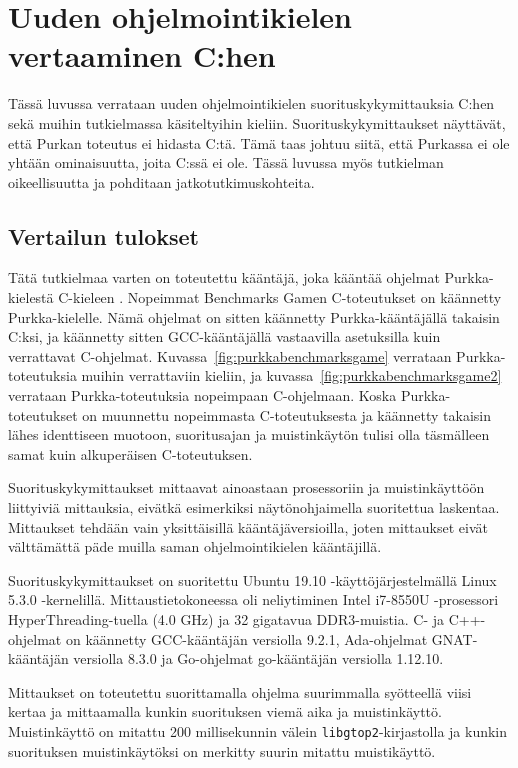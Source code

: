 \section{Uuden ohjelmointikielen vertaaminen C:hen}

Tässä luvussa verrataan uuden ohjelmointikielen suorituskykymittauksia C:hen
sekä muihin tutkielmassa käsiteltyihin kieliin. Suorituskykymittaukset
näyttävät, että Purkan toteutus ei hidasta C:tä. Tämä taas johtuu siitä, että
Purkassa ei ole yhtään ominaisuutta, joita C:ssä ei ole. Tässä luvussa myös
tutkielman oikeellisuutta ja pohditaan jatkotutkimuskohteita.

\subsection{Vertailun tulokset}
\label{sec:results}

Tätä tutkielmaa varten on toteutettu kääntäjä, joka kääntää ohjelmat
Purkka-kielestä C-kieleen \citep{purkka}. Nopeimmat Benchmarks Gamen
C-toteutukset on käännetty Purkka-kielelle. Nämä ohjelmat on sitten käännetty
Purkka-kääntäjällä takaisin C:ksi, ja käännetty sitten GCC-kääntäjällä
vastaavilla asetuksilla kuin verrattavat C-ohjelmat.
Kuvassa~\ref{fig:purkkabenchmarksgame} verrataan Purkka-toteutuksia muihin
verrattaviin kieliin, ja kuvassa~\ref{fig:purkkabenchmarksgame2} verrataan
Purkka-toteutuksia nopeimpaan C-ohjelmaan. Koska Purkka-toteutukset on
muunnettu nopeimmasta C-toteutuksesta ja käännetty takaisin lähes identtiseen
muotoon, suoritusajan ja muistinkäytön tulisi olla täsmälleen samat kuin
alkuperäisen C-toteutuksen.

Suorituskykymittaukset mittaavat ainoastaan prosessoriin ja muistinkäyttöön
liittyiviä mittauksia, eivätkä esimerkiksi näytönohjaimella suoritettua
laskentaa. Mittaukset tehdään vain yksittäisillä kääntäjäversioilla, joten
mittaukset eivät välttämättä päde muilla saman ohjelmointikielen kääntäjillä.

Suorituskykymittaukset on suoritettu Ubuntu 19.10 -käyttöjärjestelmällä Linux
5.3.0 -kernelillä. Mittaustietokoneessa oli neliytiminen Intel i7-8550U
-prosessori Hy\-per\-Thread\-ing-tuella (4.0 GHz) ja 32 gigatavua DDR3-muistia.
C- ja C++-ohjelmat on käännetty GCC-kääntäjän versiolla 9.2.1, Ada-ohjelmat
GNAT-kääntäjän versiolla 8.3.0 ja Go-ohjelmat go-kääntäjän versiolla 1.12.10.

Mittaukset on toteutettu suorittamalla ohjelma suurimmalla syötteellä viisi
kertaa ja mittaamalla kunkin suorituksen viemä aika ja muistinkäyttö.
Muistinkäyttö on mitattu 200 millisekunnin välein \texttt{libgtop2}-kirjastolla
ja kunkin suorituksen muistinkäytöksi on merkitty suurin mitattu muistikäyttö.

